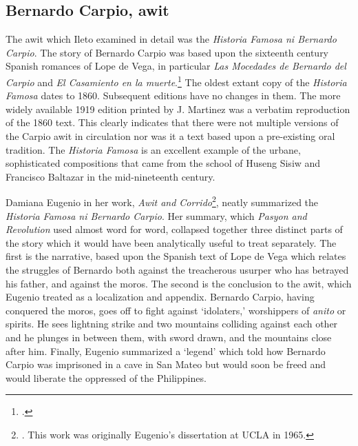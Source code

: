 \subsection{Bernardo Carpio, awit}

The awit which Ileto examined in detail was the \textit{Historia Famosa ni Bernardo Carpio}. The story of Bernardo Carpio was based upon the sixteenth century Spanish romances of Lope de Vega, in particular \textit{Las Mocedades de Bernardo del Carpio} and \textit{El Casamiento en la muerte}.\footcite[9]{Castro1985} The oldest extant copy of the \textit{Historia Famosa} dates to 1860. Subsequent editions have no changes in them. The more widely available 1919 edition printed by J. Martinez was a verbatim reproduction of the 1860 text. This clearly indicates that there were not multiple versions of the Carpio awit in circulation nor was it a text based upon a pre-existing oral tradition. The \textit{Historia Famosa} is an excellent example of the urbane, sophisticated compositions that came from the school of Huseng Sisiw and Francisco Baltazar in the mid-nineteenth century. 

Damiana Eugenio in her work, \textit{Awit and Corrido}\footnote{\cite{Eugenio1987}. This work was originally Eugenio's dissertation at UCLA in 1965.}, neatly summarized the \textit{Historia Famosa ni Bernardo Carpio}. Her summary, which \textit{Pasyon and Revolution} used almost word for word, collapsed together three distinct parts of the story which it would have been analytically useful to treat separately. The first is the narrative, based upon the Spanish text of Lope de Vega which relates the struggles of Bernardo both against the treacherous usurper who has betrayed his father, and against the moros. The second is the conclusion to the awit, which Eugenio treated as a localization and appendix. Bernardo Carpio, having conquered the moros, goes off to fight against \enquote*{idolaters,} worshippers of \textit{anito} or spirits. He sees lightning strike and two mountains colliding against each other and he plunges in between them, with sword drawn, and the mountains close after him. Finally, Eugenio summarized a \enquote*{legend} which told how Bernardo Carpio was imprisoned in a cave in San Mateo but would soon be freed and would liberate the oppressed of the Philippines.

